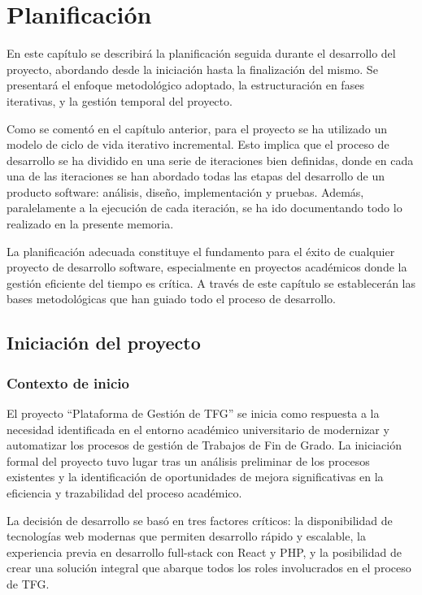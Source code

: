 \documentclass[12pt,a4paper,oneside]{report}
\begin{document}
\chapter{Planificación}\label{planificaciuxf3n}
En este capítulo se describirá la planificación seguida durante el
desarrollo del proyecto, abordando desde la iniciación hasta la
finalización del mismo. Se presentará el enfoque metodológico adoptado,
la estructuración en fases iterativas, y la gestión temporal del
proyecto.

Como se comentó en el capítulo anterior, para el proyecto se ha
utilizado un modelo de ciclo de vida iterativo incremental. Esto implica
que el proceso de desarrollo se ha dividido en una serie de iteraciones
bien definidas, donde en cada una de las iteraciones se han abordado
todas las etapas del desarrollo de un producto software: análisis,
diseño, implementación y pruebas. Además, paralelamente a la ejecución
de cada iteración, se ha ido documentando todo lo realizado en la
presente memoria.

La planificación adecuada constituye el fundamento para el éxito de
cualquier proyecto de desarrollo software, especialmente en proyectos
académicos donde la gestión eficiente del tiempo es crítica. A través de
este capítulo se establecerán las bases metodológicas que han guiado
todo el proceso de desarrollo.

\section{Iniciación del proyecto}\label{iniciaciuxf3n-del-proyecto}

\subsection{Contexto de inicio}\label{contexto-de-inicio}

El proyecto ``Plataforma de Gestión de TFG'' se inicia como respuesta a
la necesidad identificada en el entorno académico universitario de
modernizar y automatizar los procesos de gestión de Trabajos de Fin de
Grado. La iniciación formal del proyecto tuvo lugar tras un análisis
preliminar de los procesos existentes y la identificación de
oportunidades de mejora significativas en la eficiencia y trazabilidad
del proceso académico.

La decisión de desarrollo se basó en tres factores críticos: la
disponibilidad de tecnologías web modernas que permiten desarrollo
rápido y escalable, la experiencia previa en desarrollo full-stack con
React y PHP, y la posibilidad de crear una solución integral que abarque
todos los roles involucrados en el proceso de TFG.
\end{document}
